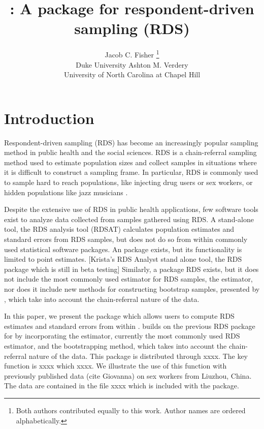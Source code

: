 \documentclass[article, shortnames]{jss}
\author{Jacob C. Fisher
        \thanks{Both authors contributed equally to this work.  Author names are ordered alphabetically.}
	       \\Duke University \And 
        Ashton M. Verdery\\University of North Carolina at Chapel Hill
								}
\title{\pkg{RDS2}: A \proglang{Stata} package for respondent-driven sampling (RDS)}
\begin{document}

\section[Introduction]{Introduction}
Respondent-driven sampling (RDS) has become an increasingly popular sampling method in public health and the social sciences. RDS is a chain-referral sampling method used to estimate population sizes and collect samples in situations where it is difficult to construct a sampling frame.  In particular, RDS is commonly used to sample hard to reach populations, like injecting drug users or sex workers, or hidden populations like jazz musicians \citep{heckathorn97}.

Despite the extensive use of RDS in public health applications, few software tools exist to analyze data collected from samples gathered using RDS.  A stand-alone tool, the RDS analysis tool (RDSAT) \citep{rdsat} calculates population estimates and standard errors from RDS samples, but does not do so from within commonly used statistical software packages.  An  package  \citep{r-rds} exists, but its functionality is limited to point estimates.  [Krista's RDS Analyst stand alone tool, the  RDS package which is still in beta testing]  Similarly, a  package RDS \citep{stata-rds} exists, but it does not include the most commonly used estimator for RDS samples, the \citet{vh2008} estimator, nor does it include new methods for constructing bootstrap samples, presented by \citet{salganik2006}, which take into account the chain-referral nature of the data.

In this paper, we present the  package  which allows users to compute RDS estimates and standard errors from within .   builds on the previous RDS package for  by incorporating the \citet{vh2008} estimator, currently the most commonly used RDS estimator, and the \citet{salganik2006} bootstrapping method, which takes into account the chain-referral nature of the data.  This package is distributed through xxxx.  The key function is xxxx which xxxx.  We illustrate the use of this function with previously published data (cite Giovanna) on sex workers from Liuzhou, China.  The data are contained in the file xxxx which is included with the  package.
\end{document}
